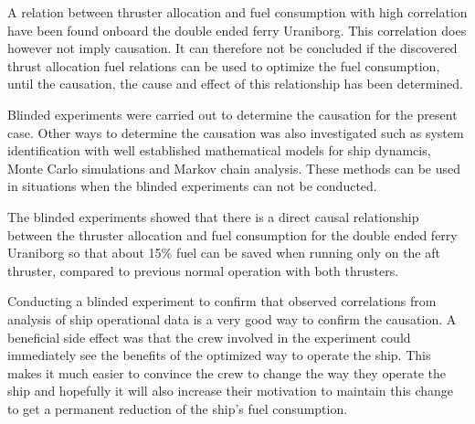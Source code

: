 A relation between thruster allocation and fuel consumption with high correlation have been found onboard the double ended ferry Uraniborg. 
This correlation does however not imply causation. It can therefore not be concluded if the discovered thrust allocation fuel relations can be used to optimize the fuel consumption, until the causation, the cause and effect of this relationship has been determined.

Blinded experiments were carried out to determine the causation for the present case. Other ways to determine the causation was also investigated such as system identification with well established mathematical models for ship dynamcis, Monte Carlo simulations and Markov chain analysis. These methods can be used in situations when the blinded experiments can not be conducted. 

The blinded experiments showed that there is a direct causal relationship between the thruster allocation and fuel consumption for the double ended ferry Uraniborg so that about 15\% fuel can be saved when running only on the aft thruster, compared to previous normal operation with both thrusters.  

Conducting a blinded experiment to confirm that observed correlations from analysis of ship operational data is a very good way to confirm the causation. A beneficial side effect was that the crew involved in the experiment could immediately see the benefits of the optimized way to operate the ship. This makes it much easier to convince the crew to change the way they operate the ship and hopefully it will also increase their motivation to maintain this change to get a permanent reduction of the ship's fuel consumption.   
